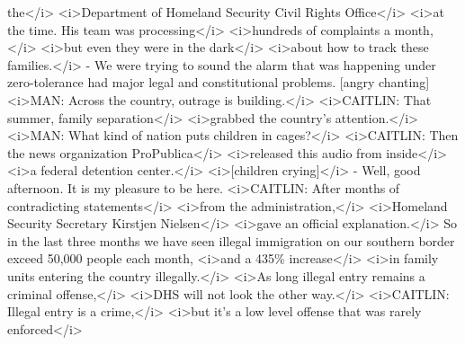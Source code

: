 \begin{itemize}
\begin{itemize}
    the\textless{}/i\textgreater{} \textless{}i\textgreater{}Department
    of Homeland Security Civil Rights Office\textless{}/i\textgreater{}
    \textless{}i\textgreater{}at the time. His team was
    processing\textless{}/i\textgreater{}
    \textless{}i\textgreater{}hundreds of complaints a
    month,\textless{}/i\textgreater{} \textless{}i\textgreater{}but even
    they were in the dark\textless{}/i\textgreater{}
    \textless{}i\textgreater{}about how to track these
    families.\textless{}/i\textgreater{} - We were trying to sound the
    alarm that was happening under zero-tolerance had major legal and
    constitutional problems. {[}angry chanting{]}
    \textless{}i\textgreater{}MAN: Across the country, outrage is
    building.\textless{}/i\textgreater{}
    \textless{}i\textgreater{}CAITLIN: That summer, family
    separation\textless{}/i\textgreater{}
    \textless{}i\textgreater{}grabbed the country's
    attention.\textless{}/i\textgreater{} \textless{}i\textgreater{}MAN:
    What kind of nation puts children in
    cages?\textless{}/i\textgreater{} \textless{}i\textgreater{}CAITLIN:
    Then the news organization ProPublica\textless{}/i\textgreater{}
    \textless{}i\textgreater{}released this audio from
    inside\textless{}/i\textgreater{} \textless{}i\textgreater{}a
    federal detention center.\textless{}/i\textgreater{}
    \textless{}i\textgreater{}{[}children
    crying{]}\textless{}/i\textgreater{} - Well, good afternoon. It is
    my pleasure to be here. \textless{}i\textgreater{}CAITLIN: After
    months of contradicting statements\textless{}/i\textgreater{}
    \textless{}i\textgreater{}from the
    administration,\textless{}/i\textgreater{}
    \textless{}i\textgreater{}Homeland Security Secretary Kirstjen
    Nielsen\textless{}/i\textgreater{} \textless{}i\textgreater{}gave an
    official explanation.\textless{}/i\textgreater{} So in the last
    three months we have seen illegal immigration on our southern border
    exceed 50,000 people each month, \textless{}i\textgreater{}and a
    435\% increase\textless{}/i\textgreater{}
    \textless{}i\textgreater{}in family units entering the country
    illegally.\textless{}/i\textgreater{} \textless{}i\textgreater{}As
    long illegal entry remains a criminal
    offense,\textless{}/i\textgreater{} \textless{}i\textgreater{}DHS
    will not look the other way.\textless{}/i\textgreater{}
    \textless{}i\textgreater{}CAITLIN: Illegal entry is a
    crime,\textless{}/i\textgreater{} \textless{}i\textgreater{}but it's
    a low level offense that was rarely
    enforced\textless{}/i\textgreater{}

\end{itemize}
\end{itemize}
